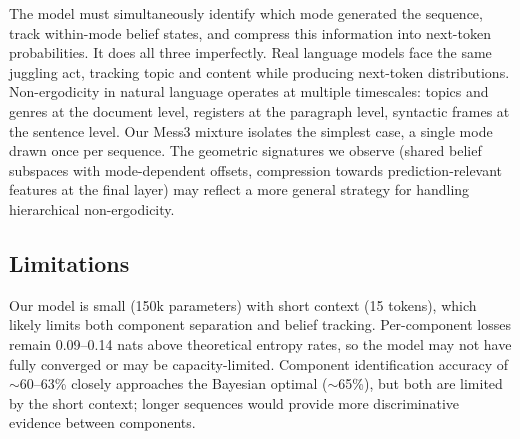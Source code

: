 \documentclass{article}
\begin{document}
The model must simultaneously identify which mode generated the sequence, track within-mode belief states, and compress this information into next-token probabilities. It does all three imperfectly. Real language models face the same juggling act, tracking topic and content while producing next-token distributions. Non-ergodicity in natural language operates at multiple timescales: topics and genres at the document level, registers at the paragraph level, syntactic frames at the sentence level. Our Mess3 mixture isolates the simplest case, a single mode drawn once per sequence. The geometric signatures we observe (shared belief subspaces with mode-dependent offsets, compression towards prediction-relevant features at the final layer) may reflect a more general strategy for handling hierarchical non-ergodicity.

\subsection{Limitations}

Our model is small (150k parameters) with short context (15 tokens), which likely limits both component separation and belief tracking. Per-component losses remain 0.09--0.14 nats above theoretical entropy rates, so the model may not have fully converged or may be capacity-limited. Component identification accuracy of $\sim$60--63\% closely approaches the Bayesian optimal ($\sim$65\%), but both are limited by the short context; longer sequences would provide more discriminative evidence between components.




\end{document}

